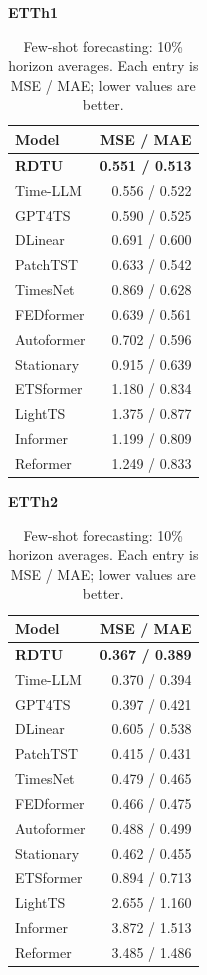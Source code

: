 \begin{table}[H]\centering\small
\caption{Few-shot forecasting: 10\% horizon averages. Each entry is MSE / MAE; lower values are better.}\label{tab:few-shot-forecasting-10per-brief}
\begin{minipage}[t]{0.48\linewidth}\vspace{0pt}\centering\small
\textbf{ETTh1}\par\smallskip
\begin{tabular}{lr}\toprule Model & MSE / MAE\\\midrule
\rowcolor{blue!5}
\textbf{RDTU} & \textbf{0.551 / 0.513}\\
Time-LLM & 0.556 / 0.522\\
GPT4TS & 0.590 / 0.525\\
DLinear & 0.691 / 0.600\\
PatchTST & 0.633 / 0.542\\
TimesNet & 0.869 / 0.628\\
FEDformer & 0.639 / 0.561\\
Autoformer & 0.702 / 0.596\\
Stationary & 0.915 / 0.639\\
ETSformer & 1.180 / 0.834\\
LightTS & 1.375 / 0.877\\
Informer & 1.199 / 0.809\\
Reformer & 1.249 / 0.833\\
\bottomrule\end{tabular}\end{minipage}\hfill\begin{minipage}[t]{0.48\linewidth}\vspace{0pt}\centering\small
\textbf{ETTh2}\par\smallskip
\begin{tabular}{lr}\toprule Model & MSE / MAE\\\midrule
\rowcolor{blue!5}
\textbf{RDTU} & \textbf{0.367 / 0.389}\\
Time-LLM & 0.370 / 0.394\\
GPT4TS & 0.397 / 0.421\\
DLinear & 0.605 / 0.538\\
PatchTST & 0.415 / 0.431\\
TimesNet & 0.479 / 0.465\\
FEDformer & 0.466 / 0.475\\
Autoformer & 0.488 / 0.499\\
Stationary & 0.462 / 0.455\\
ETSformer & 0.894 / 0.713\\
LightTS & 2.655 / 1.160\\
Informer & 3.872 / 1.513\\
Reformer & 3.485 / 1.486\\
\bottomrule\end{tabular}\end{minipage}
\end{table}
